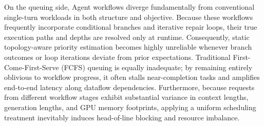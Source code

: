 \documentclass[sigconf,review,anonymous]{acmart}
\begin{document}

On the queuing side, Agent workflows diverge fundamentally from conventional single-turn workloads in both 
structure and objective. Because these workflows frequently incorporate conditional branches and iterative 
repair loops, their true execution paths and depths are resolved only at runtime. Consequently, static topology-aware 
priority estimation becomes highly unreliable whenever branch outcomes or loop iterations deviate from prior expectations. 
Traditional First-Come-First-Serve (FCFS) queuing is equally inadequate; by remaining entirely oblivious to workflow progress, 
it often stalls near-completion tasks and amplifies end-to-end latency along dataflow dependencies. Furthermore, because 
requests from different workflow stages exhibit substantial variance in context lengths, generation lengths, and GPU memory 
footprints, applying a uniform scheduling treatment inevitably induces head-of-line blocking and resource imbalance.
\end{document}
